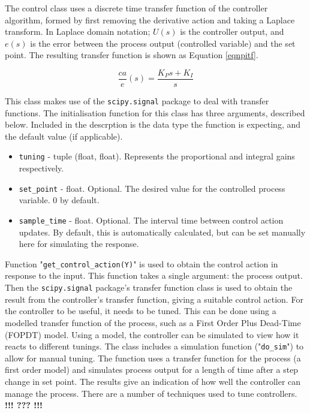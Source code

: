 \documentclass[twoside,a4]{report}
\def\br{\newline \newline \noindent}
\def\cbh{\large\bfseries !!! ??? !!! \normalsize\normalfont}
\begin{document}
	\noindent
	The control class uses a discrete time transfer function of the controller algorithm, formed by first removing the derivative action and taking a Laplace transform. In Laplace domain notation; $U(s)$ is the controller output, and $e(s)$ is the error between the process output (controlled variable) and the set point. The resulting transfer function is shown as Equation \ref{eqnpitf}.
	
	\begin{equation}
		\frac{ca}{e}(s) = \frac{K_P  s + K_I}{s}
		\label{eqnpitf}
	\end{equation}
	
	\noindent
	This class makes use of the \texttt{scipy.signal} package to deal with transfer functions.\br
	The initialisation function for this class has three arguments, described below. Included in the descrption is the data type the function is expecting, and the default value (if applicable).

	\begin{itemize}
		\item \texttt{tuning} - tuple (float, float). Represents the proportional and integral gains respectively.
		\item \texttt{set\_point} - float. Optional. The desired value for the controlled process variable. 0 by default.
		\item \texttt{sample\_time} - float. Optional. The interval time between control action updates. By default, this is automatically calculated, but can be set manually here for simulating the response.
	\end{itemize}

	Function "\texttt{get\_control\_action(Y)}" is used to obtain the control action in response to the input. This function takes a single argument: the process output. Then the \texttt{scipy.signal} package's transfer function class is used to obtain the result from the controller's transfer function, giving a suitable control action.
	\br
	For the controller to be useful, it needs to be tuned. This can be done using a modelled transfer function of the process, such as a First Order Plus Dead-Time (FOPDT) model. Using a model, the controller can be simulated to view how it reacts to different tunings. The class includes a simulation function ("\texttt{do\_sim}") to allow for manual tuning. The function uses a transfer function for the process (a first order model) and simulates process output for a length of time after a step change in set point. The results give an indication of how well the controller can manage the process. 
	\br
	There are a number of techniques used to tune controllers. \cbh
\end{document}
